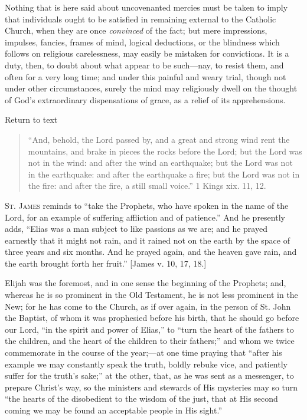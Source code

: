 
Nothing that is here said about uncovenanted mercies must be taken
to imply that individuals ought to be satisfied in remaining external
to the Catholic Church, when they are once \emph{convinced} of the
fact; but mere impressions, impulses, fancies, frames of mind, logical
deductions, or the blindness which follows on religious carelessness,
may easily be mistaken for convictions. It is a duty, then, to doubt
about what appear to be such—nay, to resist them, and often for a
very long time; and under this painful and weary trial, though not
under other circumstances, surely the mind may religiously dwell on
the thought of God's extraordinary dispensations of grace, as a relief
of its apprehensions.

Return to text


\begin{quote}

``And, behold, the Lord passed by, and a great and strong
wind rent the mountains, and brake in pieces the rocks before the
Lord; but the Lord was not in the wind: and after the wind an
earthquake; but the Lord was not in the earthquake: and after the
earthquake a fire; but the Lord was not in the fire: and after the
fire, a still small voice.'' 1 Kings xix. 11, 12.

\end{quote}

S\textsc{t}. J\textsc{ames} reminds to ``take the Prophets, who have spoken in
the name of the Lord, for an example of suffering affliction and of
patience.'' And he presently adds, ``Elias was a man subject
to like passions as we are; and he prayed earnestly that it might not
rain, and it rained not on the earth by the space of three years and
six months. And he prayed again, and the heaven gave rain, and the
earth brought forth her fruit.'' [James v. 10, 17, 18.]

Elijah was the foremost, and in one sense the beginning of the
Prophets; and, whereas he is so prominent in the Old Testament, he is
not less prominent in the New; for he has come to the Church, as if
over again, in the person of St. John the Baptist, of whom it was
prophesied before his birth, that he should go before our Lord,
``in the spirit and power of Elias,'' to ``turn the heart
of the fathers to the children, and the heart of the children to their
fathers;'' and whom we twice commemorate in the course of the
year;—at one time praying that ``after his example we may
constantly speak the truth, boldly rebuke vice, and patiently suffer
for the truth's sake;'' at the other, that, as he was sent as a
messenger, to prepare Christ's way, so the ministers and stewards of
His mysteries may so turn ``the hearts of the disobedient to the
wisdom of the just, that at His second coming we may be found an
acceptable people in His sight.''

